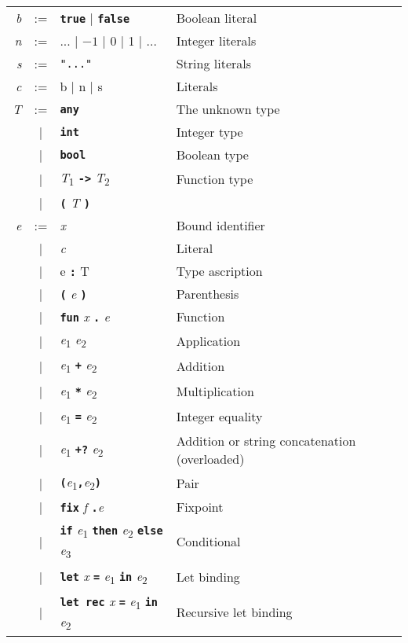 \documentclass{article}
\newcommand{\kw}[1]{\textbf{\texttt{#1}}}
\newcommand{\metavar}[1]{\textit{#1}}
\begin{document}
\begin{tabular}{rcll}
\metavar{b} & := & \kw{true} | \kw{false} & Boolean literal \\
\metavar{n} & := & ... | $-1$ | 0 | 1 | ... & Integer literals \\
\metavar{s} & := & \texttt{"..."} & String literals \\
\metavar{c} & := & b | n | s & Literals \\
\metavar{T} & := & \kw{any} & The unknown type \\
            & |  & \kw{int} & Integer type \\
            & |  & \kw{bool} & Boolean type \\
            & |  & \metavar{T}\textsubscript{1} \kw{->} \metavar{T}\textsubscript{2} & Function type \\
            & |  & \kw{(} \metavar{T} \kw{)} \\
\metavar{e} & := & \textit{x}  & Bound identifier \\
            & |  & \metavar{c} & Literal \\
            & |  & e \kw{:} T  & Type ascription \\
            & |  & \kw{(} \metavar{e} \kw{)} & Parenthesis \\
            & |  & \kw{fun} \metavar{x} \kw{.} \metavar{e} & Function \\
            & |  & \metavar{e}\textsubscript{1} \metavar{e}\textsubscript{2}
                 & Application \\
            & |  & \metavar{e}\textsubscript{1} \kw{+} \metavar{e}\textsubscript{2}
                 & Addition \\
            & |  & \metavar{e}\textsubscript{1} \kw{*} \metavar{e}\textsubscript{2}
                 & Multiplication \\
            & |  & \metavar{e}\textsubscript{1} \kw{=} \metavar{e}\textsubscript{2}
                 & Integer equality \\
            & |  & \metavar{e}\textsubscript{1} \kw{+?} \metavar{e}\textsubscript{2}
                 & Addition or string concatenation (overloaded) \\
            & |  & \kw{(}\metavar{e}\textsubscript{1}\kw{,}\metavar{e}\textsubscript{2}\kw{)}
                 & Pair \\
            & |  & \kw{fix} \metavar{f} \kw{.}\metavar{e}
                 & Fixpoint \\
            & |  & \kw{if} \metavar{e}\textsubscript{1} \kw{then} \metavar{e}\textsubscript{2} \kw{else} \metavar{e}\textsubscript{3}
                 & Conditional \\
            & |  & \kw{let} \metavar{x} \kw{=} \metavar{e}\textsubscript{1} \kw{in} \metavar{e}\textsubscript{2}
                 & Let binding \\
            & |  & \kw{let rec} \metavar{x} \kw{=} \metavar{e}\textsubscript{1} \kw{in} \metavar{e}\textsubscript{2}
                 & Recursive let binding \\

\end{tabular}
\end{document}

